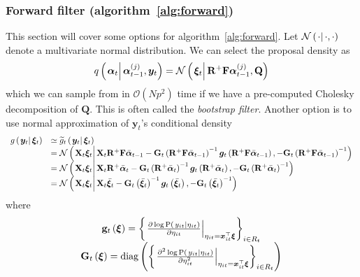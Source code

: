 \documentclass[9pt, notitlepage]{article}
\renewcommand{\vec}[1]{\bm{#1}}
\newcommand{\vecb}[1]{\bar{\vec{#1}}}
\newcommand{\mat}[1]{\mathbf{#1}}
\newcommand{\Lbrace}[1]{\left\{ #1\right\}}
\newcommand{\Lparen}[1]{\left( #1\right)}
\newcommand{\Cond}[2]{\left. #1 \vphantom{#2} \right\vert  #2}
\newcommand{\Prob}{\text{P}}
\newcommand{\optor}[2]{#1\Lparen{#2}}
\newcommand{\optorC}[3]{\optor{#1}{\Cond{#2}{#3}}}
\newcommand{\propC}[2]{\optorC{\Prob}{#1}{#2}}
\newcommand{\normalC}[3]{\optorC{\mathcal{N}}{#1}{#2,#3}}
\newcommand{\IDC}[2]{\optorC{q}{#1}{#2}}
\newcommand{\diag}[1]{\optor{\text{diag}}{#1}}
\newcommand{\partic}[3]{#1_{#2}^{\Lparen{#3}}}
\newcommand{\bigO}[1]{\mathcal{O}\Lparen{#1}}
\newcommand{\dimState}{p}
\newcommand{\nPart}{N}
\begin{document}
\subsubsection*{Forward filter (algorithm~\ref{alg:forward})}
This section will cover some options for algorithm~\ref{alg:forward}. Let $\normalC{\cdot}{\cdot}{\cdot}$ denote a multivariate normal distribution. We can select the proposal density as%
%
\begin{equation}
	\IDC{\vec{\alpha}_t}{\partic{\vec{\alpha}}{t-1}{j}, \vec{y}_t} = %
		\normalC{\vec{\xi}_t}{\mat{R}^{+}\mat{F}\partic{\vec{\alpha}}{t-1}{j}}{\mat{Q}}
\end{equation}%
%
which we can sample from in $\bigO{\nPart \dimState^2}$ time if we have a pre-computed Cholesky decomposition of $\mat{Q}$. This is often called the \emph{bootstrap filter}. Another option is to use normal approximation of $\vec{y}_t$'s conditional density%
%
\begin{equation}\begin{array}{cl}
	\optorC{g}{\vec{y}_t}{\vec{\xi}_t} & \simeq  \optorC{\widetilde{g}_t}{\vec{y}_t}{\vec{\xi}_t} \\ 
%
&= \normalC{
		\mat{X}_t\vec{\xi}_t
	}{ %
		\mat{X}_t\mat{R}^{+}\mat{F}\vecb{\alpha}_{t - 1} -
		\mat{G}_t\Lparen{\mat{R}^{+}\mat{F}\vecb{\alpha}_{t - 1}}^{-1}
		\vec{g}_t\Lparen{\mat{R}^{+}\mat{F}\vecb{\alpha}_{t - 1}}
	}{ %
		- \mat{G}_t\Lparen{\mat{R}^{+}\mat{F}\vecb{\alpha}_{t - 1}}^{-1}
	} \\
%
&= \normalC{
		\mat{X}_t\vec{\xi}_t
	}{ %
		\mat{X}_t\mat{R}^{+}\vecb{\alpha}_{t} -
		\mat{G}_t\Lparen{\mat{R}^{+}\vecb{\alpha}_{t}}^{-1}
		\vec{g}_t\Lparen{\mat{R}^{+}\vecb{\alpha}_{t}}
	}{ %
		- \mat{G}_t\Lparen{\mat{R}^{+}\vecb{\alpha}_{t}}^{-1}
	} \\
%
&= \normalC{
		\mat{X}_t\vec{\xi}_t
	}{ %
		\mat{X}_t\vecb{\xi}_{t} -
		\mat{G}_t\Lparen{\vecb{\xi}_{t}}^{-1}
		\vec{g}_t\Lparen{\vecb{\xi}_{t}}
	}{ %
		- \mat{G}_t\Lparen{\vecb{\xi}_{t}}^{-1}
	} \\ 
\end{array}\end{equation}
%
where%
%
\begin{equation}\begin{array}{c}
\mat{g}_t\Lparen{\vec{\xi}} =
		\Lbrace{\left.\frac{
		\partial \log \propC{y_{it}}{\eta_{it}}
	}{
		\partial\eta_{it}
	}\right|_{\eta_{it} = \vec{x}_{it}^\top\vec{\xi}} }_{i \in R_t} \\
%
	\mat{G}_t\Lparen{\vec{\xi}} =
		\diag{\Lbrace{\left.\frac{
		\partial^2 \log \propC{y_{it}}{\eta_{it}}
	}{
		\partial\eta_{it}^2
	}\right|_{\eta_{it} = \vec{x}_{it}^\top\vec{\xi}} }_{i \in R_t}}
\end{array}\end{equation}
\end{document}
